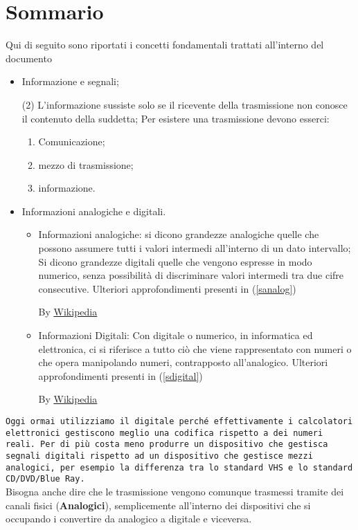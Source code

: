 \section{Sommario}
Qui di seguito sono riportati i concetti fondamentali trattati all'interno
del documento
\begin{itemize}
	\item Informazione e segnali;
		\begin{tasks}(2)
			\task L'informazione sussiste solo se il ricevente della
			trasmissione non conosce il contenuto della suddetta;
			\task Per esistere una trasmissione devono esserci:
				\begin{enumerate}
					\item Comunicazione;
					\item mezzo di trasmissione;
					\item informazione.
				\end{enumerate}
		\end{tasks}
	\item Informazioni analogiche e digitali.
		\begin{itemize}
			\item Informazioni analogiche: si dicono grandezze analogiche
				quelle che possono assumere tutti i valori intermedi
				all'interno di un dato intervallo; Si dicono grandezze digitali
				quelle che vengono espresse in modo numerico, senza possibilità
				di discriminare valori intermedi tra due cifre consecutive.
				Ulteriori approfondimenti presenti in (\ref{sanalog})
				\begin{center}
					By
					\underline{\href{https://it.wikipedia.org/wiki/Analogico}{Wikipedia}}
				\end{center}
			\item Informazioni Digitali: Con digitale o numerico, in
				informatica ed elettronica, ci si riferisce a tutto ciò che
				viene rappresentato con numeri o che opera manipolando numeri,
				contrapposto all'analogico. Ulteriori approfondimenti presenti
				in (\ref{sdigital})
				\begin{center}
					By \underline{\href{https://it.wikipedia.org/wiki/Digitale_(informatica)}{Wikipedia}}
				\end{center}
		\end{itemize}
\end{itemize}
\texttt{Oggi ormai utilizziamo il digitale perché effettivamente i calcolatori
elettronici gestiscono meglio una codifica rispetto a dei numeri reali. Per di
più costa meno produrre un dispositivo che gestisca segnali digitali rispetto
ad un dispositivo che gestisce mezzi analogici, per esempio la differenza tra
lo standard VHS e lo standard CD/DVD/Blue Ray.}\\
Bisogna anche dire che le trasmissione vengono comunque trasmessi tramite dei
canali fisici ({\bf Analogici}), semplicemente all'interno dei dispositivi che si
occupando i convertire da analogico a digitale e viceversa.
